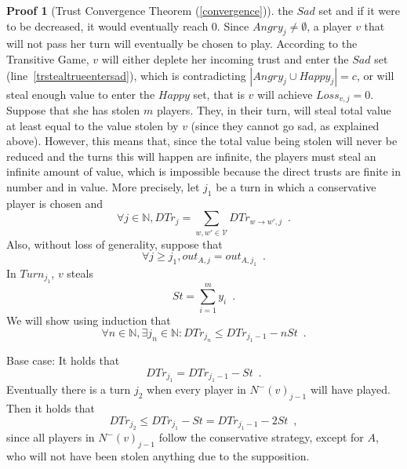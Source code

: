 \documentclass[11pt]{llncs}
\theoremstyle{definition}
\newtheorem*{sepproof}{Proof}
\begin{document}
\begin{sepproof}[Trust Convergence Theorem (\ref{convergence})]
       the $Sad$ set and if it were to be decreased, it would eventually reach 0. Since $Angry_j \neq \emptyset$, a player
       $v$ that will not pass her turn will eventually be chosen to play. According to the Transitive Game, $v$ will either
       deplete her incoming trust and enter the $Sad$ set (line~\ref{trstealtrueentersad}), which is contradicting $|Angry_j
       \cup Happy_j| = c$, or will steal enough value to enter the $Happy$ set, that is $v$ will achieve $Loss_{v, j} = 0$.
       Suppose that she has stolen $m$ players. They, in their turn, will steal total value at least equal to the value
       stolen by $v$ (since they cannot go sad, as explained above). However, this means that, since the total value being
       stolen will never be reduced and the turns this will happen are infinite, the players must steal an infinite amount of
       value, which is impossible because the direct trusts are finite in number and in value. More precisely, let $j_1$ be
       a turn in which a conservative player is chosen and
       \begin{equation*}
          \forall j \in \mathbb{N}, DTr_j = \sum\limits_{w,w' \in \mathcal{V}}DTr_{w \rightarrow w', j} \enspace.
       \end{equation*}
       Also, without loss of generality, suppose that
       \begin{equation*}
          \forall j \geq j_1, out_{A, j} = out_{A, j_1} \enspace.
       \end{equation*}
       In $Turn_{j_1}$, $v$ steals
       \begin{equation*}
          St = \sum\limits_{i=1}^{m}y_i \enspace.
       \end{equation*}
       We will show using induction that
       \begin{equation*}
          \forall n \in \mathbb{N}, \exists j_n \in \mathbb{N} : DTr_{j_n} \leq DTr_{j_1-1} - nSt \enspace.
       \end{equation*}

       Base case: It holds that
       \begin{equation*}
          DTr_{j_1} = DTr_{j_1-1} - St \enspace.
       \end{equation*}
       Eventually there is a turn $j_2$ when every player in $N^{-}(v)_{j-1}$ will have played. Then it holds that
       \begin{equation*}
          DTr_{j_2} \leq DTr_{j_1} - St = DTr_{j_1-1} - 2St \enspace,
       \end{equation*}
       since all players in $N^{-}(v)_{j-1}$ follow the conservative strategy, except for $A$, who will not have been stolen
       anything due to the supposition.


\end{sepproof}
\end{document}
